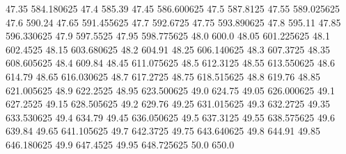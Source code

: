           47.35       584.180625
           47.4           585.39
          47.45       586.600625
           47.5         587.8125
          47.55       589.025625
           47.6           590.24
          47.65       591.455625
           47.7         592.6725
          47.75       593.890625
           47.8           595.11
          47.85       596.330625
           47.9         597.5525
          47.95       598.775625
           48.0            600.0
          48.05       601.225625
           48.1         602.4525
          48.15       603.680625
           48.2           604.91
          48.25       606.140625
           48.3         607.3725
          48.35       608.605625
           48.4           609.84
          48.45       611.075625
           48.5         612.3125
          48.55       613.550625
           48.6           614.79
          48.65       616.030625
           48.7         617.2725
          48.75       618.515625
           48.8           619.76
          48.85       621.005625
           48.9         622.2525
          48.95       623.500625
           49.0           624.75
          49.05       626.000625
           49.1         627.2525
          49.15       628.505625
           49.2           629.76
          49.25       631.015625
           49.3         632.2725
          49.35       633.530625
           49.4           634.79
          49.45       636.050625
           49.5         637.3125
          49.55       638.575625
           49.6           639.84
          49.65       641.105625
           49.7         642.3725
          49.75       643.640625
           49.8           644.91
          49.85       646.180625
           49.9         647.4525
          49.95       648.725625
           50.0            650.0
